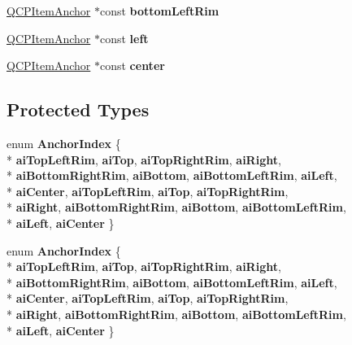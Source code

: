 \begin{DoxyCompactItemize}
\item 
\hyperlink{class_q_c_p_item_anchor}{Q\+C\+P\+Item\+Anchor} $\ast$const {\bfseries bottom\+Left\+Rim}\hypertarget{class_q_c_p_item_ellipse_a2e27048c703d979f2f9fbcb146894e5b}{}\label{class_q_c_p_item_ellipse_a2e27048c703d979f2f9fbcb146894e5b}

\item 
\hyperlink{class_q_c_p_item_anchor}{Q\+C\+P\+Item\+Anchor} $\ast$const {\bfseries left}\hypertarget{class_q_c_p_item_ellipse_abda006703c0a018ae6403013ba0b3049}{}\label{class_q_c_p_item_ellipse_abda006703c0a018ae6403013ba0b3049}

\item 
\hyperlink{class_q_c_p_item_anchor}{Q\+C\+P\+Item\+Anchor} $\ast$const {\bfseries center}\hypertarget{class_q_c_p_item_ellipse_abeab6b2c874c603b4b1cd8dc452cae8d}{}\label{class_q_c_p_item_ellipse_abeab6b2c874c603b4b1cd8dc452cae8d}

\end{DoxyCompactItemize}
\subsection*{Protected Types}
\begin{DoxyCompactItemize}
\item 
enum {\bfseries Anchor\+Index} \{ \\*
{\bfseries ai\+Top\+Left\+Rim}, 
{\bfseries ai\+Top}, 
{\bfseries ai\+Top\+Right\+Rim}, 
{\bfseries ai\+Right}, 
\\*
{\bfseries ai\+Bottom\+Right\+Rim}, 
{\bfseries ai\+Bottom}, 
{\bfseries ai\+Bottom\+Left\+Rim}, 
{\bfseries ai\+Left}, 
\\*
{\bfseries ai\+Center}, 
{\bfseries ai\+Top\+Left\+Rim}, 
{\bfseries ai\+Top}, 
{\bfseries ai\+Top\+Right\+Rim}, 
\\*
{\bfseries ai\+Right}, 
{\bfseries ai\+Bottom\+Right\+Rim}, 
{\bfseries ai\+Bottom}, 
{\bfseries ai\+Bottom\+Left\+Rim}, 
\\*
{\bfseries ai\+Left}, 
{\bfseries ai\+Center}
 \}\hypertarget{class_q_c_p_item_ellipse_a415009889543169f35b70795f415e45e}{}\label{class_q_c_p_item_ellipse_a415009889543169f35b70795f415e45e}

\item 
enum {\bfseries Anchor\+Index} \{ \\*
{\bfseries ai\+Top\+Left\+Rim}, 
{\bfseries ai\+Top}, 
{\bfseries ai\+Top\+Right\+Rim}, 
{\bfseries ai\+Right}, 
\\*
{\bfseries ai\+Bottom\+Right\+Rim}, 
{\bfseries ai\+Bottom}, 
{\bfseries ai\+Bottom\+Left\+Rim}, 
{\bfseries ai\+Left}, 
\\*
{\bfseries ai\+Center}, 
{\bfseries ai\+Top\+Left\+Rim}, 
{\bfseries ai\+Top}, 
{\bfseries ai\+Top\+Right\+Rim}, 
\\*
{\bfseries ai\+Right}, 
{\bfseries ai\+Bottom\+Right\+Rim}, 
{\bfseries ai\+Bottom}, 
{\bfseries ai\+Bottom\+Left\+Rim}, 
\\*
{\bfseries ai\+Left}, 
{\bfseries ai\+Center}
 \}\hypertarget{class_q_c_p_item_ellipse_a415009889543169f35b70795f415e45e}{}\label{class_q_c_p_item_ellipse_a415009889543169f35b70795f415e45e}

\end{DoxyCompactItemize}
